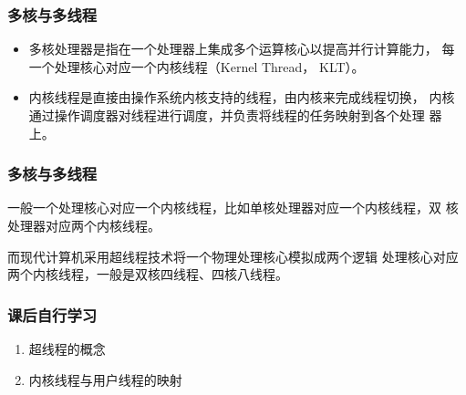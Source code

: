 \documentclass[compress,table]{beamer} %
\newcommand{\kai}{\CJKfamily{KaiTi}}
\def\Red{\color{red}}
\begin{document}
\begin{frame}[fragile]
  \frametitle{多核与多线程}
  \begin{itemize}
  \item 多核处理器是指在一个处理器上集成多个运算核心以提高并行计算能力，
    每一个处理核心对应一个内核线程（Kernel Thread， KLT）。
  \item 内核线程是直接由操作系统内核支持的线程，由内核来完成线程切换，
    内核通过操作调度器对线程进行调度，并负责将线程的任务映射到各个处理
    器上。
  \end{itemize}

\end{frame}

\begin{frame}[fragile]
  \frametitle{多核与多线程}
  一般一个处理核心对应一个内核线程，比如单核处理器对应一个内核线程，双
  核处理器对应两个内核线程。

  {\Red\kai 而现代计算机采用超线程技术将一个物理处理核心模拟成两个逻辑
    处理核心对应两个内核线程，一般是双核四线程、四核八线程。}

  \begin{figure}
\centering
{}
\end{figure}
\end{frame}

\begin{frame}[fragile]
  \frametitle{课后自行学习}
  \begin{enumerate}
  \item 超线程的概念
  \item 内核线程与用户线程的映射
  \end{enumerate}
\end{frame}
\end{document}
